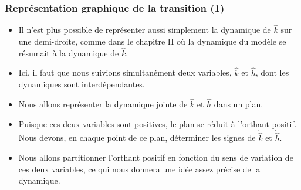 \documentclass[10pt,notheorems]{beamer}
\theoremstyle{plain}
\theoremstyle{definition} %
\begin{document}
\begin{frame}
  \frametitle{Représentation graphique de la transition (1)}

  \begin{itemize}

  \item Il n'est plus possible de représenter aussi simplement la dynamique de $\hat k$ sur une demi-droite, comme dans le chapitre II où la dynamique du modèle se résumait à la dynamique de $\hat k$.\newline

  \item Ici, il faut que nous suivions simultanément deux variables, $\hat k$ et $\hat h$, dont les dynamiques sont interdépendantes.\newline

  \item Nous allons représenter la dynamique jointe de $\hat k$ et $\hat h$ dans un plan.\newline

  \item Puisque ces deux variables sont positives, le plan se réduit à l'orthant positif. Nous devons, en chaque point de ce plan, déterminer les signes de $\dot{\hat k}$ et $\dot{\hat h}$.\newline

  \item Nous allons partitionner l'orthant positif en fonction du sens de variation de ces deux variables, ce qui nous donnera une idée assez précise de la dynamique.

  \end{itemize}

\end{frame}
\end{document}
